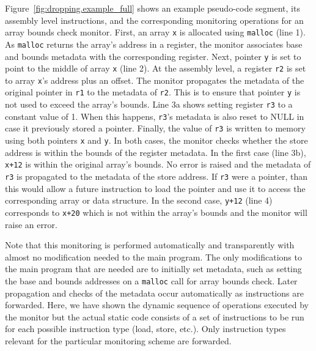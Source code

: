 Figure~\ref{fig:dropping.example_full} shows an example pseudo-code segment,
its assembly level instructions, and the corresponding monitoring operations
for an array bounds check monitor. 
First, an array {\tt x} is allocated using {\tt malloc} (line 1). 
As {\tt malloc} returns the array's address in a register, the monitor
associates base and bounds metadata with the corresponding register. 
Next, pointer {\tt y} is set to point to the middle of array {\tt x} (line 2). 
At the assembly level, a register {\tt r2} is set to array {\tt x}'s address plus an offset.
The monitor propagates the metadata of the original pointer in {\tt r1} to the
metadata of {\tt r2}. This is to ensure that pointer {\tt y} is not used to exceed the array's bounds.
Line 3a shows setting register {\tt r3} to a constant value of 1.
When this happens,
{\tt r3}'s metadata is also reset to NULL in case it previously stored a
pointer. 
Finally, the value of {\tt r3} is written to memory using both pointers {\tt x} and {\tt y}.
In both cases, the monitor checks whether the store address is within the bounds of the register metadata. In the first case (line 3b), {\tt x+12}
is within the original array's bounds. No error is raised and the metadata of
{\tt r3} is propagated to the metadata of the store address. If {\tt r3} were a
pointer, than this would allow a future instruction to load the pointer and use
it to access the corresponding array or data structure. In the second case,
{\tt y+12} (line 4) corresponds to {\tt x+20} which is not within the array's bounds and
the monitor will raise an error. 

Note that this monitoring is performed automatically and transparently with
almost no modification needed to the main program. The only modifications to
the main program that are needed are to initially set metadata, such as setting
the base and bounds addresses on a {\tt malloc} call for array bounds check.
Later propagation and checks of the metadata occur automatically as
instructions are forwarded.
Here, we have shown the dynamic sequence of operations executed by the monitor but
the actual static code consists of a set of instructions to be run for each
possible instruction type (load, store, etc.). Only instruction types relevant
for the particular monitoring scheme are forwarded.

